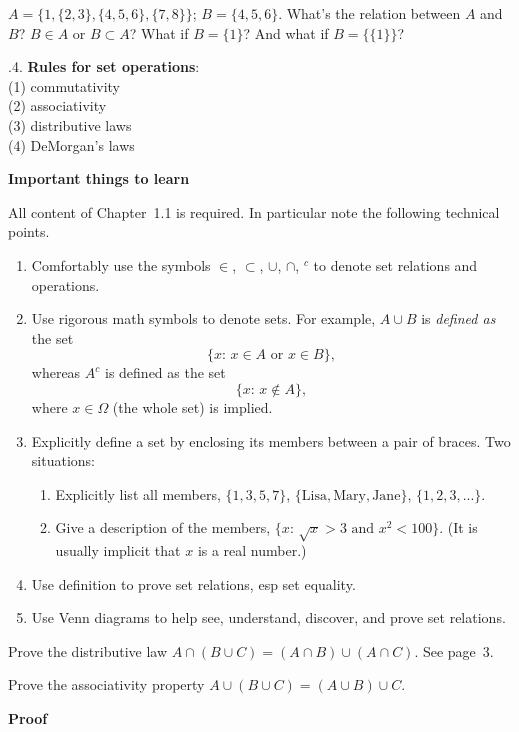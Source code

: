 \documentclass[12pt]{article}
\begin{document}
\exercise
$A = \bigl\{1, \{2,3\}, \{4,5,6\}, \{7,8\}\bigr\}$;
$B = \{4,5,6\}$.
What's the relation between $A$ and $B$?
$B \in A$ or $B \subset A$?
What if $B = \{1\}$? And what if $B = \bigl\{\{1\}\bigr\}$?

.4. \textbf{Rules for set operations}:\\
(1) commutativity\\
(2) associativity\\
(3) distributive laws\\
(4) DeMorgan's laws

\textbf{Important things to learn}

All content of Chapter~1.1 is required. In particular
note the following technical points.
\begin{enumerate}
\item
Comfortably use the symbols
$\in$, $\subset$, $\cup$, $\cap$, $^c$ to denote set relations and
operations.
\item
Use rigorous math symbols to denote sets. For example,
$A \cup B$ is \emph{defined as} the set
\[
\{x:\, x \in A \text{ or } x \in B\},
\]
whereas $A^c$ is defined as the set
\[
\{x:\, x \notin A\},
\]
where $x \in \Omega$ (the whole set) is implied.
\item
Explicitly define a set by enclosing its members between a pair of
braces. Two situations:
\begin{enumerate}
\item Explicitly list all members, \eg
$\{1, 3, 5, 7\}$, $\{\text{Lisa}, \text{Mary}, \text{Jane}\}$,
$\{1, 2, 3,...\}$.
\item Give a description of the members, \eg
$\{x:\, \sqrt{x} > 3 \text{ and } x^2 < 100\}$.
(It is usually implicit that $x$ is a real number.)
\end{enumerate}
\item
Use definition to prove set relations, esp set equality.
\item
Use Venn diagrams to help see, understand, discover, and prove set
relations.
\end{enumerate}

\example Prove the distributive law
$A \cap (B \cup C) = (A \cap B) \cup (A \cap C)$.
See page~3.

\example Prove the associativity property
$A \cup (B \cup C) = (A \cup B) \cup C$.

\textbf{Proof}
\end{document}
